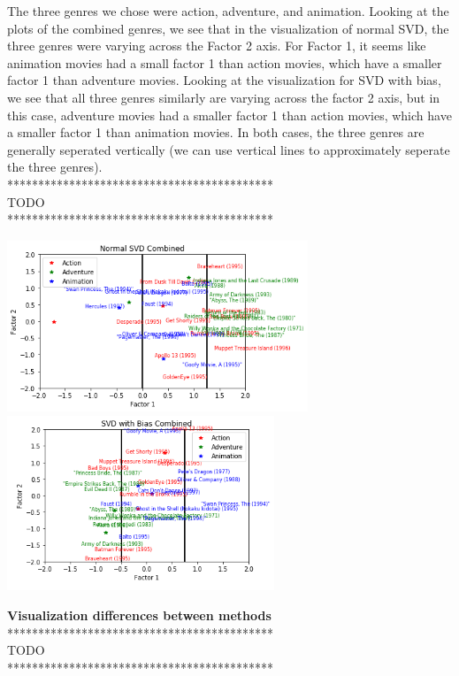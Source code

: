 The three genres we chose were action, adventure, and animation. Looking at the plots of the combined genres, we see that in the visualization of normal SVD, the three genres were varying across the Factor 2 axis. For Factor 1, it seems like animation movies had a small factor 1 than action movies, which have a smaller factor 1 than adventure movies. Looking at the visualization for SVD with bias, we see that all three genres similarly are varying across the factor 2 axis, but in this case, adventure movies had a smaller factor 1 than action movies, which have a smaller factor 1 than animation movies. In both cases, the three genres are generally seperated vertically (we can use vertical lines to approximately seperate the three genres). \\
*******************************************\\
TODO \\
*******************************************\\
\begin{center}
	\includegraphics[width=9cm]{Pictures/1_edit}\includegraphics[width=8cm]{Pictures/2_edit}
\end{center}
\noindent\textbf{Visualization differences between methods }\\
*******************************************\\
TODO \\
*******************************************\\

